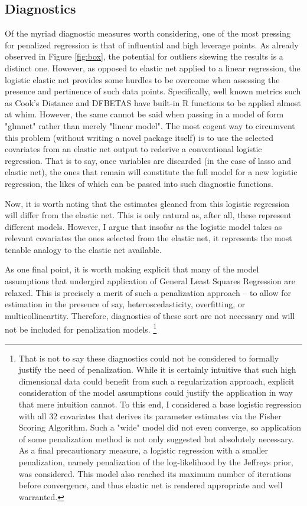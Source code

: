 \documentclass[11pt]{article}
\begin{document}
\subsection{Diagnostics}
	Of the myriad diagnostic measures worth considering, one of the most pressing for penalized regression is that of influential and high leverage points.  As already observed in Figure \ref{fig:box}, the potential for outliers skewing the results is a distinct one.  However, as opposed to elastic net applied to a linear regression, the logistic elastic net provides some hurdles to be overcome when assessing the presence and pertinence of such data points.  Specifically, well known metrics such as Cook's Distance and DFBETAS have built-in R functions to be applied almost at whim.  However, the same cannot be said when passing in a model of form "glmnet" rather than merely "linear model".  The most cogent way to circumvent this problem (without writing a novel package itself) is to use the selected covariates from an elastic net output to rederive a conventional logistic regression.  That is to say, once variables are discarded (in the case of lasso and elastic net), the ones that remain will constitute the full model for a new logistic regression, the likes of which can be passed into such diagnostic functions.  
	
	Now, it is worth noting that the estimates gleaned from this logistic regression will differ from the elastic net.  This is only natural as, after all, these represent different models.  However, I argue that insofar as the logistic model takes as relevant covariates the ones selected from the elastic net, it represents the most tenable analogy to the elastic net available.  
	
	As one final point, it is worth making explicit that many of the model assumptions that undergird application of  General Least Squares Regression are relaxed.  This is precisely a merit of such a penalization approach -- to allow for estimation in the presence of say, heteroscedasticity, overfitting, or multicollineartity.  Therefore, diagnostics of these sort are not necessary and will not be included for penalization models.  \footnote {That is not to say these diagnostics could not be considered to formally justify the need of penalization.  While it is certainly intuitive that such high dimensional data could benefit from such a regularization approach, explicit consideration of the model assumptions could justify the application in way that mere intuition cannot.  To this end, I considered a base logistic regression with all 32 covariates that derives its parameter estimates via the Fisher Scoring Algorithm.  Such a "wide" model did not even converge, so application of some penalization method is not only suggested but absolutely necessary.  As a final precautionary measure, a logistic regression with a smaller penalization, namely penalization of the log-likelihood by the Jeffreys prior, was considered.  This model also reached its maximum number of iterations before convergence, and thus elastic net is rendered appropriate and well warranted.}
\end{document}
